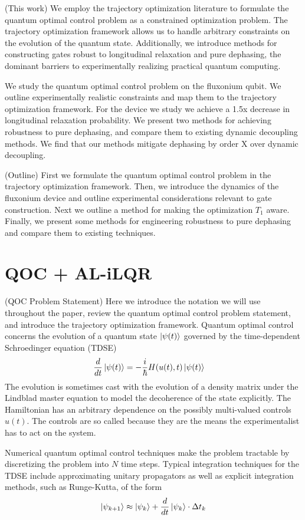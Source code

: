 \documentclass[
  amsfonts,
  amsmath,
  tbtags,
  amssymb,
  aps,
  nobibnotes,
  twocolumn,
]{revtex4-2}
\begin{document}
(This work) We employ the trajectory optimization
literature to formulate the quantum
optimal control problem as a constrained optimization problem.
The trajectory optimization framework allows us to handle arbitrary
constraints on the evolution of the quantum state. Additionally,
we introduce methods for constructing gates robust to longitudinal
relaxation and pure dephasing, the dominant barriers to experimentally
realizing practical quantum computing.

We study the quantum optimal control problem on the fluxonium qubit.
We outline experimentally realistic constraints and map them to
the trajectory optimization framework. For the device we study
we achieve a 1.5x decrease in longitudinal relaxation probability.
We present two methods for achieving robustness to pure dephasing,
and compare them to existing dynamic decoupling methods. We find that 
our methods mitigate dephasing by order X over dynamic decoupling.

(Outline)  First we formulate the quantum optimal control problem
in the trajectory optimization framework. Then, we introduce the dynamics
of the fluxonium device and outline experimental considerations
relevant to gate construction. Next we outline a method for
making the optimization $T_{1}$ aware. Finally, we present
some methods for engineering robustness to pure dephasing and
compare them to existing techniques.


\section{QOC + AL-iLQR}
(QOC Problem Statement) Here we introduce the notation
we will use throughout the paper,
review the quantum optimal control problem statement,
and introduce the trajectory optimization framework.
Quantum optimal control concerns the evolution of
a quantum state $\ket{\psi(t)}$ governed by the time-dependent
Schroedinger equation (TDSE)
\label{eq:tdse}
\begin{align}
  \frac{d}{dt} \ket{\psi(t)} &= -\frac{i}{\hbar} H(u(t), t) \ket{\psi(t)}
\end{align}
The evolution is sometimes cast with the evolution
of a density matrix under the Lindblad master equation to
model the decoherence of the state explicitly. The Hamiltonian
has an arbitrary dependence on the possibly multi-valued controls $u(t)$.
The controls are so called because they are the means the experimentalist has to
act on the system.

Numerical quantum optimal control techniques make
the problem tractable by discretizing the problem into $N$
time steps. Typical integration techniques for the TDSE include
approximating unitary propagators as well as explicit integration methods,
such as Runge-Kutta, of the form
\label{eq:step-approx}
\begin{align}
  \ket{\psi_{k + 1}} \approx \ket{\psi_{k}} + \frac{d}{dt} \ket{\psi_{k}} \cdot \Delta t_{k}
\end{align}
\end{document}
